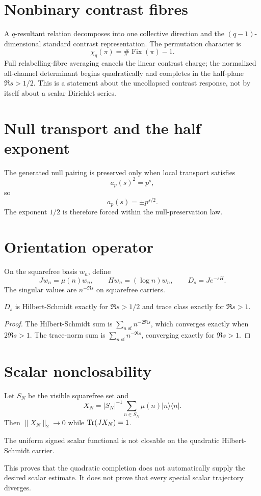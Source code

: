 \documentclass[11pt,a4paper]{article}
\begin{document}
\section{Nonbinary contrast fibres}
A $q$-resultant relation decomposes into one collective direction and the $(q-1)$-dimensional standard contrast representation. The permutation character is
\begin{equation}
\chi_q(\pi)=\#\operatorname{Fix}(\pi)-1.
\end{equation}
Full relabelling-fibre averaging cancels the linear contrast charge; the normalized all-channel determinant begins quadratically and completes in the half-plane $\Re s>1/2$. This is a statement about the uncollapsed contrast response, not by itself about a scalar Dirichlet series.

\section{Null transport and the half exponent}
The generated null pairing is preserved only when local transport satisfies
\begin{equation}
a_p(s)^2=p^s,
\end{equation}
so
\begin{equation}
a_p(s)=\pm p^{s/2}.
\end{equation}
The exponent $1/2$ is therefore forced within the null-preservation law.

\section{Orientation operator}
On the squarefree basis $w_n$, define
\begin{equation}
Jw_n=\mu(n)w_n,\qquad Hw_n=(\log n)w_n,\qquad D_s=Je^{-sH}.
\end{equation}
The singular values are $n^{-\Re s}$ on squarefree carriers.
\begin{theorem}
$D_s$ is Hilbert-Schmidt exactly for $\Re s>1/2$ and trace class exactly for $\Re s>1$.
\end{theorem}
\begin{proof}
The Hilbert-Schmidt sum is $\sum_{n\text{ sf}}n^{-2\Re s}$, which converges exactly when $2\Re s>1$. The trace-norm sum is $\sum_{n\text{ sf}}n^{-\Re s}$, converging exactly for $\Re s>1$.
\end{proof}

\section{Scalar nonclosability}
Let $S_N$ be the visible squarefree set and
\begin{equation}
X_N=|S_N|^{-1}\sum_{n\in S_N}\mu(n)|n\rangle\langle n|.
\end{equation}
Then $\|X_N\|_2\to0$ while $\operatorname{Tr}(JX_N)=1$.
\begin{theorem}
The uniform signed scalar functional is not closable on the quadratic Hilbert-Schmidt carrier.
\end{theorem}
This proves that the quadratic completion does not automatically supply the desired scalar estimate. It does not prove that every special scalar trajectory diverges.
\end{document}
